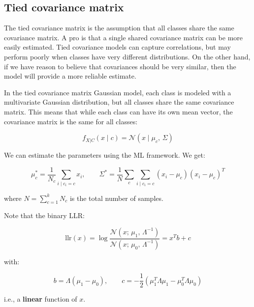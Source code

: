 \subsection{Tied covariance matrix}

The tied covariance matrix is the assumption that all classes share the same covariance matrix. A pro is that a single shared covariance matrix can be more easily estimated. Tied covariance models can capture correlations, but may perform poorly when classes have very different distributions. On the other hand, if we have reason to believe that covariances should be very similar, then the model will provide a more reliable estimate.

In the tied covariance matrix Gaussian model, each class is modeled with a multivariate Gaussian distribution, but all classes share the same covariance matrix. This means that while each class can have its own mean vector, the covariance matrix is the same for all classes:

$$f_{X|C}(x \mid c) = \mathcal{N}(x \mid \mu_c,\, \Sigma)$$

We can estimate the parameters using the ML framework. We get:

$$\mu_c^* = \frac{1}{N_c}\sum_{i \mid c_i=c} x_i, \qquad \Sigma^* = \frac{1}{N}\sum_c \sum_{i \mid c_i=c}(x_i - \mu_c)(x_i - \mu_c)^T$$

where $N = \sum_{c=1}^{k} N_c$ is the total number of samples.

Note that the binary LLR:

$$\mathrm{llr}(x) = \log \frac{\mathcal{N}(x;\, \mu_1,\, \Lambda^{-1})}{\mathcal{N}(x;\, \mu_0,\, \Lambda^{-1})} = x^T b + c$$

with:

$$b = \Lambda(\mu_1 - \mu_0), \qquad c = -\frac{1}{2}\!\left(\mu_1^T\Lambda\mu_1 - \mu_0^T\Lambda\mu_0\right)$$

i.e., a \textbf{linear} function of $x$.
